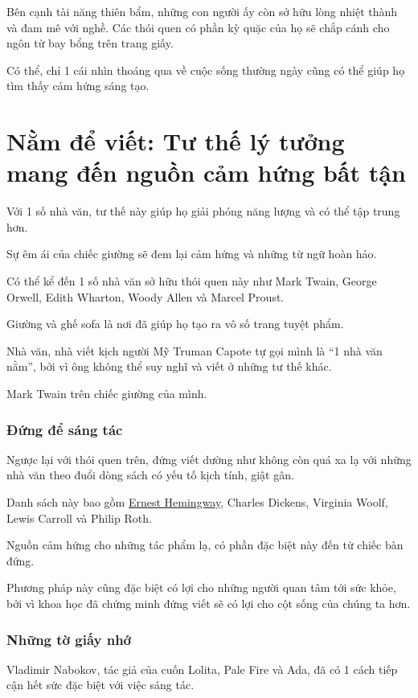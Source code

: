 \documentclass{article}
\begin{document}
%
Bên cạnh tài năng thiên bẩm, những con người ấy còn sở hữu lòng nhiệt thành và đam mê với nghề. Các thói quen có phần kỳ quặc của họ sẽ chắp cánh cho ngôn từ bay bổng trên trang giấy.

Có thể, chỉ 1 cái nhìn thoáng qua về cuộc sống thường ngày cũng có thể giúp họ tìm thấy cảm hứng sáng tạo.

\section{Nằm để viết: Tư thế lý tưởng mang đến nguồn cảm hứng bất tận}
Với 1 số nhà văn, tư thế này giúp họ giải phóng năng lượng và có thể tập trung hơn.

Sự êm ái của chiếc giường sẽ đem lại cảm hứng và những từ ngữ hoàn hảo.

Có thể kể đến 1 số nhà văn sở hữu thói quen này như Mark Twain, George Orwell, Edith Wharton, Woody Allen và Marcel Proust.

Giường và ghế sofa là nơi đã giúp họ tạo ra vô số trang tuyệt phẩm.

Nhà văn, nhà viết kịch người Mỹ Truman Capote tự gọi mình là ``1 nhà văn nằm'', bởi vì ông không thể suy nghĩ và viết ở những tư thế khác.

%
\textsf{Mark Twain trên chiếc giường của mình.}

\subsubsection{Đứng để sáng tác}
Ngược lại với thói quen trên, đứng viết dường như không còn quá xa lạ với những nhà văn theo đuổi dòng sách có yếu tố kịch tính, giật gân.

Danh sách này bao gồm \href{http://tramdoc.vn/tin-tuc/25-cuon-sach-ma-nguoi-dan-ong-nao-cung-nen-doc-it-nhat-mot-lan-trong-doi-nZN4aW.html}{Ernest Hemingway}, Charles Dickens, Virginia Woolf, Lewis Carroll và Philip Roth.

Nguồn cảm hứng cho những tác phẩm lạ, có phần đặc biệt này đến từ chiếc bàn đứng.

Phương pháp này cũng đặc biệt có lợi cho những người quan tâm tới sức khỏe, bởi vì khoa học đã chứng minh đứng viết sẽ có lợi cho cột sống của chúng ta hơn.

\subsubsection{Những tờ giấy nhớ}
Vladimir Nabokov, tác giả của cuốn Lolita, Pale Fire và Ada, đã có 1 cách tiếp cận hết sức đặc biệt với việc sáng tác.
\end{document}
